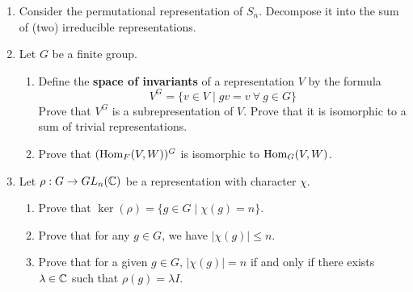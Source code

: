 \documentclass[../psets.tex]{subfiles}
\begin{document}
\begin{enumerate}
\begin{enumerate}
    \end{enumerate}
    \item Consider the permutational representation of $S_n$. Decompose it into the sum of (two) irreducible representations.
    \item Let $G$ be a finite group.
    \begin{enumerate}
        \item Define the \textbf{space of invariants} of a representation $V$ by the formula
        \begin{equation*}
            V^G = \{v\in V\mid gv=v\ \forall\ g\in G\}
        \end{equation*}
        Prove that $V^G$ is a subrepresentation of $V$. Prove that it is isomorphic to a sum of trivial representations.
        \item Prove that $(\operatorname{Hom}_F(V,W))^G$ is isomorphic to $\operatorname{Hom}_G(V,W)$.
    \end{enumerate}
    \item Let $\rho:G\to GL_n(\mathbb{C})$ be a representation with character $\chi$.
    \begin{enumerate}
        \item Prove that $\ker(\rho)=\{g\in G\mid\chi(g)=n\}$.
        \item Prove that for any $g\in G$, we have $|\chi(g)|\leq n$.
        \item Prove that for a given $g\in G$, $|\chi(g)|=n$ if and only if there exists $\lambda\in\mathbb{C}$ such that $\rho(g)=\lambda I$.
    \end{enumerate}
\end{enumerate}
\end{document}
